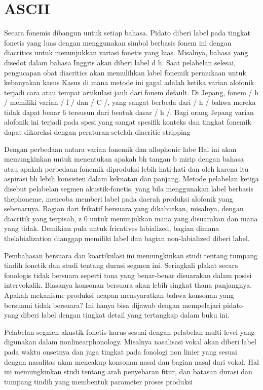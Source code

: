 \section{ASCII}
Secara fonemis dibangun untuk setiap bahasa.
Pidato diberi label pada tingkat fonetis yang luas dengan menggunakan simbol berbasis fonem ini dengan diacritics
untuk menunjukkan variasi fonetis yang luas. Misalnya, bahasa yang disedot dalam bahasa Inggris akan diberi label d h.
Saat pelabelan selesai, pengucapan obat diacritics akan memulihkan label fonemik permukaan
untuk kebanyakan kasus Kasus di mana metode ini gagal adalah ketika varian alofonik terjadi
cara atau tempat artikulasi jauh dari fonem default. Di Jepang, fonem / h /
memiliki varian / f / dan / C /, yang sangat berbeda dari / h / bahwa mereka tidak dapat benar 6
tersusun dari bentuk dasar / h /. Bagi orang Jepang varian alofonik ini terjadi pada spesi yang sangat spesifik
konteks dan tingkat fonemik dapat dikoreksi dengan peraturan setelah diacritic stripping

Dengan perbedaan antara varian fonemik dan allophonic labe Hal ini akan memungkinkan untuk menentukan apakah bh tangan b mirip dengan bahasa atau apakah perbedaan fonemik diproduksi lebih hati-hati dan oleh karena itu aspirasi bh lebih konsisten dalam kekuatan dan panjang. Metode pelabelan ketiga disebut pelabelan segmen akustik-fonetis, yang bila menggunakan label berbasis thephoneme, mencoba memberi label pada daerah produksi alofonik yang sebenarnya. Bagian dari frikatif bersuara yang dikaburkan, misalnya, dengan diacritik yang terpisah, z 0 untuk menunjukkan mana yang disuarakan dan mana yang tidak. Demikian pula untuk fricatives labialized, bagian dimana thelabialization dianggap memiliki label dan bagian non-labialized diberi label. 

Pembahasan bersuara dan koartikulasi ini memungkinkan studi tentang tumpang tindih fonetik dan studi tentang durasi segmen ini. Seringkali plakat secara fonologis tidak bersuara seperti tona yang benar-benar disuarakan dalam posisi intervokalik. Biasanya konsonan bersuara akan lebih singkat thana panjangnya. Apakah mekanisme produksi ucapan mensyaratkan bahwa konsonan yang bersuami tidak bersuara? Ini hanya bisa dijawab dengan mempelajari pidato yang diberi label dengan tingkat detail yang tertangkap dalam buku ini. 

Pelabelan segmen akustik-fonetis harus sesuai dengan pelabelan multi level yang digunakan dalam nonlinearphonology. Misalnya nasalisasi vokal akan diberi label pada waktu onsetnya dan juga tingkat pada fonologi non linier yang sesuai dengan nasalitas akan mencakup konsonan nasal dan bagian nasal dari vokal. Hal ini memungkinkan studi tentang arah penyebaran fitur, dan batasan durasi dan tumpang tindih yang membentuk parameter proses produksi 	

